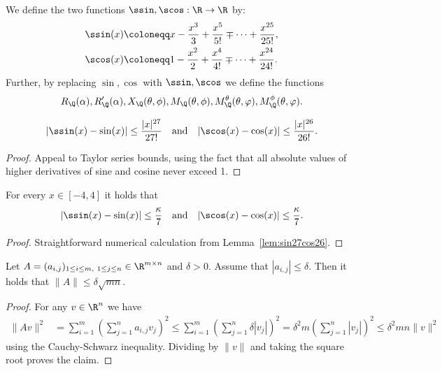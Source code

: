 \begin{definition} \label{dfn:sin_cos_approx}
\leanok
{}
    We define the two functions $\ssin, \scos: \R \to \R$ by:
    \begin{align*}
    \ssin(x) & \coloneqq x-\frac{x^3}{3}+\frac{x^5}{5!}\mp \dots +\frac{x^{25}}{25!},\\
    \scos(x) & \coloneqq 1-\frac{x^2}{2}+\frac{x^4}{4!}\mp\dots +\frac{x^{24}}{24!}.
    \end{align*}
    Further, by replacing $\sin,\cos$ with $\ssin,\scos$ we define the functions
\[
    R_{\Q}(\alpha), R'_{\Q}(\alpha), X_{\Q}(\theta, \phi), M_{\Q}(\theta, \phi), M_{\Q}^{\theta}(\theta,\varphi),M_{\Q}^{\phi}(\theta,\varphi).
\]
\end{definition}

\begin{lemma} \label{lem:sin27cos26}
\leanok
{}
    \[
        |\ssin(x)-\sin(x)|\leq \frac{|x|^{27}}{27!} \quad \text{and} \quad
    |\scos(x)-\cos(x)|\leq \frac{|x|^{26}}{26!}.
    \]
\end{lemma}
\begin{proof}
\leanok
Appeal to Taylor series bounds, using the fact that all absolute values of
higher derivatives of sine and cosine never exceed 1.
\end{proof}

\begin{lemma} \label{lem:kappa7}
\leanok
{}
    For every $x\in [-4,4]$ it holds that
    \[
    |\ssin(x)-\sin(x)| \leq \frac{\kappa}{7} \quad \text{and} \quad |\scos(x)-\cos(x)|\leq \frac{\kappa}{7}.
    \]
\end{lemma}
\begin{proof}
\leanok
Straightforward numerical calculation from Lemma~\ref{lem:sin27cos26}.
\end{proof}

\begin{lemma} \label{lem:A_le_deltamn}
  \leanok
Let $A = (a_{i,j})_{1 \leq i \leq m,\ 1 \leq j \leq n} \in \R^{m \times n}$ and $\delta >0$. Assume that $|a_{i,j}| \leq \delta$. Then it holds that $\|A\| \leq \delta \sqrt{mn}.$
\end{lemma}

\begin{proof}
\leanok
    For any $v\in \R^n$ we have
    \begin{align*}
        \|Av\|^2 &=\sum_{i=1}^m \left(\sum_{j=1}^na_{i,j}v_j\right)^2 \leq \sum_{i=1}^m\left(\sum_{j=1}^n \delta |v_j|\right)^2 = \delta^2 m\left(\sum_{j=1}^n |v_j|\right)^2 \leq \delta^2 m n \|v\|^2
    \end{align*}
    using the Cauchy-Schwarz inequality. Dividing by $\|v\|$ and taking the square root proves the claim.
\end{proof}

